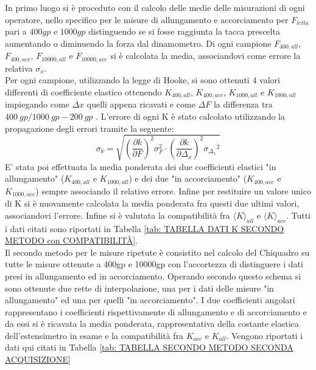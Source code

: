 \documentclass[a4paper,11pt,oneside]{article}
\begin{document}
In primo luogo si è proceduto con il calcolo delle medie delle misurazioni di ogni operatore, nello specifico per le misure di allungamento e accorciamento per $F_{letta}$ pari a $\SI{400}gp$ e $\SI{1000}gp$ distinguendo se si fosse raggiunta la tacca prescelta aumentando o diminuendo la forza dal dinamometro. Di ogni campione $F_{400, all}$, $F_{400, acc}$, $F_{10000, all}$ e $F_{10000, acc}$ si è calcolata la media, associandovi come errore la relativa $\overline{\sigma_x}$.\\
Per ogni campione, utilizzando la legge di Hooke, si sono ottenuti 4 valori differenti di coefficiente elastico ottenendo $K_{400, all}$, $K_{400, acc}$, $K_{1000, all}$ e $K_{1000, all}$ impiegando come $\Delta x$ quelli appena ricavati e come $\Delta F$ la differenza tra $\SI{400}{gp} / \SI{1000}{gp} - \SI{200}{gp}$ . L'errore di ogni K è stato calcolato utilizzando la propagazione degli errori tramite la seguente:
\begin{equation*}
   \sigma_k=\sqrt{\left ( \frac{\partial k }{\partial F } \right )^{2}\sigma_F^2 \cdot \left ( \frac{\partial k }{\partial \Delta_x } \right )^{2}{\sigma_\Delta_x}^2} 
\end{equation*}
E' stata poi effettuata la media ponderata dei due coefficienti elastici "in allungamento" ($K_{400, all}$ e $K_{1000, all}$) e dei due "in accorciamento" ($K_{400, acc}$ e $K_{1000, acc}$) sempre associando il relativo errore. Infine per restituire un valore unico di K si è nuovamente calcolata la media ponderata fra questi due ultimi valori, associandovi l'errore. Infine si è valutata la compatibilità fra ${\langle K \rangle}_{all}$ e ${\langle K \rangle}_{acc}$. Tutti i dati citati sono riportati in Tabella \ref{tab: TABELLA DATI K SECONDO METODO con COMPATIBILITÀ}.\\

Il secondo metodo per le misure ripetute è consistito nel calcolo del Chiquadro su tutte le misure ottenute a 400gp e 10000gp con l'accortezza di distinguere i dati presi in allungamento ed in accorciamento. Operando secondo questo schema si sono ottenute due rette di interpolazione, una per i dati delle misure "in allungamento" ed una per quelli "in accorciamento". I due coefficienti angolari rappresentano i coefficienti rispettivamente di allungamento e di accorciamento e da essi si è ricavata la media ponderata, rappresentativa della costante elastica dell'estensimetro in esame e la compatibilità fra ${K}_{acc}$ e ${K}_{all}$. Vengono riportati i dati qui citati in Tabella \ref{tab: TABELLA SECONDO METODO SECONDA ACQUISIZIONE}
\end{document}
